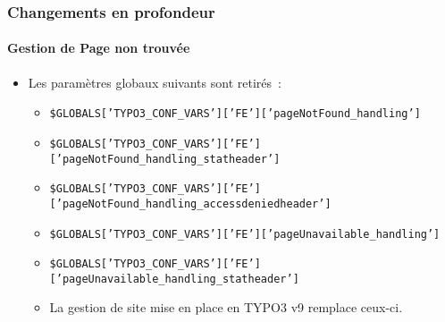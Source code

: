 
\begin{frame}[fragile]
	\frametitle{Changements en profondeur}
	\framesubtitle{Gestion de Page non trouvée}

	\begin{itemize}

		\item Les paramètres globaux suivants sont retirés~:

			\begin{itemize}
				\item {\fontsize{7}{8}\selectfont\texttt{\$GLOBALS['TYPO3\_CONF\_VARS']['FE']['pageNotFound\_handling']}}
				\item {\fontsize{7}{8}\selectfont\texttt{\$GLOBALS['TYPO3\_CONF\_VARS']['FE']['pageNotFound\_handling\_statheader']}}
				\item {\fontsize{7}{8}\selectfont\texttt{\$GLOBALS['TYPO3\_CONF\_VARS']['FE']['pageNotFound\_handling\_accessdeniedheader']}}
				\item {\fontsize{7}{8}\selectfont\texttt{\$GLOBALS['TYPO3\_CONF\_VARS']['FE']['pageUnavailable\_handling']}}
				\item {\fontsize{7}{8}\selectfont\texttt{\$GLOBALS['TYPO3\_CONF\_VARS']['FE']['pageUnavailable\_handling\_statheader']}}
			\end{itemize}

			\begin{itemize}\smaller
				\item[\ding{228}] La gestion de site mise en place en TYPO3 v9 remplace ceux-ci.
			\end{itemize}\normalsize

	\end{itemize}

\end{frame}


